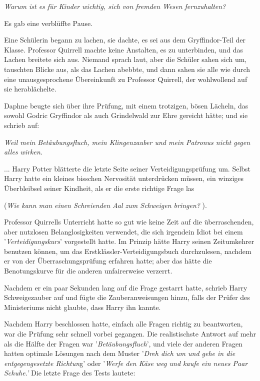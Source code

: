 \emph{\glqq{}Warum ist es für Kinder wichtig, sich von fremden Wesen
fernzuhalten?\grqq{}}

Es gab eine verblüffte Pause.

Eine Schülerin begann zu lachen, sie dachte, es sei aus dem Gryffindor-Teil der
Klasse. Professor Quirrell machte keine Anstalten, es zu unterbinden, und das
Lachen breitete sich aus. Niemand sprach laut, aber die Schüler sahen sich um,
tauschten Blicke aus, als das Lachen abebbte, und dann sahen sie alle wie durch
eine unausgesprochene Übereinkunft zu Professor Quirrell, der wohlwollend auf
sie herablächelte.

Daphne beugte sich über ihre Prüfung, mit einem trotzigen, bösen Lächeln, das
sowohl Godric Gryffindor als auch Grindelwald zur Ehre gereicht hätte; und sie
schrieb auf:

\emph{Weil mein Betäubungsfluch, mein Klingenzauber und mein Patronus nicht
gegen alles wirken.}

... Harry Potter blätterte die letzte Seite seiner Verteidigungsprüfung um.
Selbst Harry hatte ein kleines bisschen Nervosität unterdrücken müssen, ein
winziges Überbleibsel seiner Kindheit, als er die erste richtige Frage las

(\emph{\glqq{}Wie kann man einen Schreienden Aal zum Schweigen bringen?\grqq{}
}).

Professor Quirrells Unterricht hatte so gut wie keine Zeit auf die
überraschenden, aber nutzlosen Belanglosigkeiten verwendet, die sich irgendein
Idiot bei einem '\emph{Verteidigungskurs}' vorgestellt hatte. Im Prinzip hätte
Harry seinen Zeitumkehrer benutzen können, um das Erstklässler-Verteidigungsbuch
durchzulesen, nachdem er von der Überraschungsprüfung erfahren hatte; aber das
hätte die Benotungskurve für die anderen unfairerweise verzerrt.

Nachdem er ein paar Sekunden lang auf die Frage gestarrt hatte, schrieb Harry
\glqq{}Schweigezauber\grqq{} auf und fügte die Zauberanweisungen hinzu, falls der
Prüfer des Ministeriums nicht glaubte, dass Harry ihn kannte.

Nachdem Harry beschlossen hatte, einfach alle Fragen richtig zu beantworten, war
die Prüfung sehr schnell vorbei gegangen. Die realistischste Antwort auf mehr
als die Hälfte der Fragen war '\emph{Betäubungsfluch}', und viele der anderen
Fragen hatten optimale Lösungen nach dem Muster '\emph{Dreh dich um und gehe in
die entgegengesetzte Richtun}g' oder '\emph{Werfe den Käse weg und kaufe ein
neues Paar Schuhe.'} Die letzte Frage des Tests lautete:


